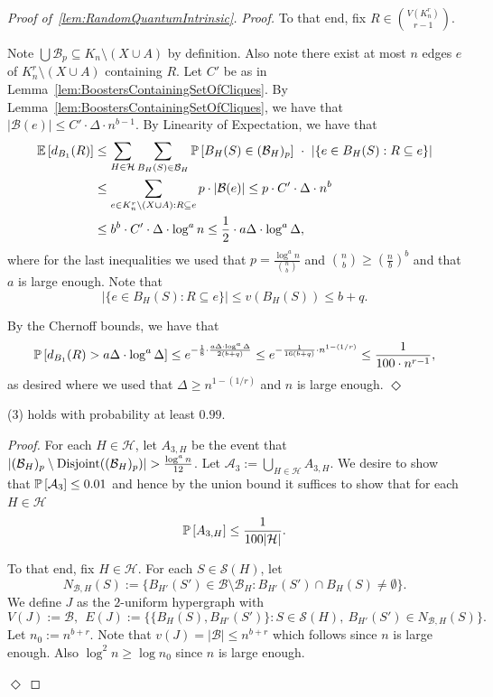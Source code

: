 \documentclass[11pt]{article}
\newcommand{\mc}[1]{\mathcal{#1}}
\newcounter{i}
\theoremstyle{plain}
\newenvironment{proofclaim}[1][]%
{\noindent \emph{Proof.} {}{#1}{}}{\hfill
	$\Diamond$\vspace{1em}}
\renewcommand{\theclaim}{\thetheorem.\arabic{claim}}
\newenvironment{lateproof}[1]
 {%
  \renewcommand{\theclaim}{\ref{#1}.\arabic{claim}}%
  \begin{proof}[Proof of~\cref{#1}]%
 }
 {\end{proof}}
\theoremstyle{plain} %
\theoremstyle{definition}
\newcommand{\Prob}[1]{\ensuremath{%
\mathbb P\left[#1\right]
}}
\newcommand{\Expect}[1]{\ensuremath{%
\mathbb E\left[#1\right]
}}
\begin{document}
\begin{lateproof}{lem:RandomQuantumIntrinsic}
\begin{proofclaim}
To that end, fix $R\in \binom{V(K_n^r)}{r-1}$. 

Note $\bigcup \mc{B}_p\subseteq K_n\setminus (X\cup A)$ by definition. Also note there exist at most $n$ edges $e$ of $K_n^r\setminus (X\cup A)$ containing $R$. Let $C'$ be as in Lemma~\ref{lem:BoostersContainingSetOfCliques}. By Lemma~\ref{lem:BoostersContainingSetOfCliques}, we have that $|\mc{B}(e)|\le  C' \cdot \Delta\cdot n^{b-1}$. By Linearity of Expectation, we have that 
\begin{align*}
\Expect{d_{B_1}(R)}&\le \sum_{H\in \mathcal{H}} \sum_{B_H(S)\in \mathcal{B}_{H}} \Prob{B_H(S)\in (\mc{B}_{H})_p}~\cdot~|\{e\in B_H(S): R\subseteq e\}| \\
&\le \sum_{e\in K_n^r\setminus (X\cup A): R\subseteq e} p\cdot |\mc{B}(e)| \le p\cdot C' \cdot \Delta \cdot n^b\\
&\le b^b\cdot C'\cdot \Delta \cdot \log^{a} n \le \frac{1}{2}\cdot a\Delta\cdot \log^{a} \Delta,
\end{align*}
where for the last inequalities we used that $p = \frac{\log^{a} n}{\binom{n}{b}}$ and $\binom{n}{b} \ge \left(\frac{n}{b}\right)^b$ and that $a$ is large enough.
Note that
$$|\{ e\in B_H(S): R\subseteq e\}| \le v(B_H(S)) \le b+q.$$

By the Chernoff bounds, we have that 
$$\Prob{d_{B_1}(R) > a\Delta\cdot \log^{a} \Delta} \le e^{-\frac{1}{8}\cdot \frac{a\Delta\cdot \log^{a} \Delta}{2(b+q)}} \le e^{-\frac{1}{16(b+q)}\cdot n^{1-(1/r)}} \le \frac{1}{100\cdot n^{r-1}},$$
as desired where we used that $\Delta \ge n^{1-(1/r)}$ and $n$ is large enough. 
\end{proofclaim}

\begin{claim}\label{cl:3Holds}
(3) holds with probability at least $0.99$.    
\end{claim}
\begin{proofclaim}
For each $H\in \mathcal{H}$, let $A_{3,H}$ be the event that $|(\mathcal{B}_{H})_p\setminus {\rm Disjoint}((\mathcal{B}_{H})_p)| > \frac{\log^{a} n}{12}$.
Let $\mathcal{A}_3 := \bigcup_{H\in \mc{H}} A_{3,H}$. We desire to show that $\Prob{\mc{A}_3} \le 0.01$ and hence by the union bound it suffices to show that for each $H\in \mc{H}$
$$\Prob{A_{3,H}} \le \frac{1}{100 |\mc{H}|}.$$

To that end, fix $H \in \mathcal{H}$. For each $S\in \mc{S}(H)$, let 
$$N_{\mathcal{B},H}(S) := \{ B_{H'}(S') \in \mc{B}\setminus \mc{B}_{H}: B_{H'}(S')\cap B_{H}(S) \ne \emptyset\}.$$
We define $J$ as the $2$-uniform hypergraph with $$V(J) := \mc{B},~~E(J) := \bigg\{ \{B_H(S), B_{H'}(S')\}: S\in \mc{S}(H),~B_{H'}(S')\in N_{\mathcal{B},H}(S) \bigg\}.$$
Let $n_0:= n^{b+r}$. Note that $v(J) =|\mc{B}| \le n^{b+r}$ which follows since $n$ is large enough. Also $\log^2 n\ge \log n_0 $ since $n$ is large enough.


\end{proofclaim}
\end{lateproof}
\end{document}
